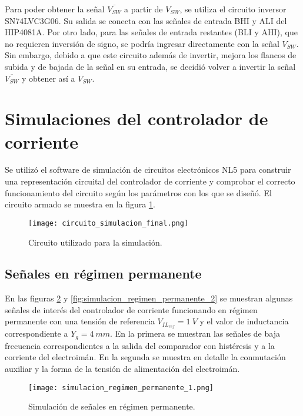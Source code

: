 Para poder obtener la señal $\overline{V_{SW}}$ a partir de $V_{SW}$, se utiliza el circuito inversor SN74LVC3G06. Su salida se conecta con las señales de entrada BHI y ALI del HIP4081A. Por otro lado, para las señales de entrada restantes (BLI y AHI), que no requieren inversión de signo, se podría ingresar directamente con la señal $V_{SW}$. Sin embargo, debido a que este circuito además de invertir, mejora los flancos de subida y de bajada de la señal en su entrada, se decidió volver a invertir la señal $\overline{V_{SW}}$ y obtener así a $V_{SW}$. 


\section{Simulaciones del controlador de corriente}

Se utilizó el software de simulación de circuitos electrónicos NL5 para construir una representación circuital del controlador de corriente y comprobar el correcto funcionamiento del circuito según los parámetros con los que se diseñó. El circuito armado se muestra en la figura \ref{fig:circuito_simulacion_final}.


\begin{figure}[H]
	\centering
	\texttt{[image: circuito\_simulacion\_final.png]}
	\caption{Circuito utilizado para la simulación.}
	\label{fig:circuito_simulacion_final}
\end{figure}


\subsection{Señales en régimen permanente}

En las figuras \ref{fig:simulacion_regimen_permanente_1} y \ref{fig:simulacion_regimen_permanente_2} se muestran algunas señales de interés del controlador de corriente funcionando en régimen permanente con una tensión de referencia $V_{IL_{ref}}=1\:V$ y el valor de inductancia correspondiente a $Y_g=4\:mm$. En la primera se muestran las señales de baja frecuencia correspondientes a la salida del comparador con histéresis y a la corriente del electroimán. En la segunda se muestra en detalle la conmutación auxiliar y la forma de la tensión de alimentación del electroimán.

\begin{figure}[H]
	\centering
	\texttt{[image: simulacion\_regimen\_permanente\_1.png]}
	\caption{Simulación de señales en régimen permanente.}
	\label{fig:simulacion_regimen_permanente_1}
\end{figure}

